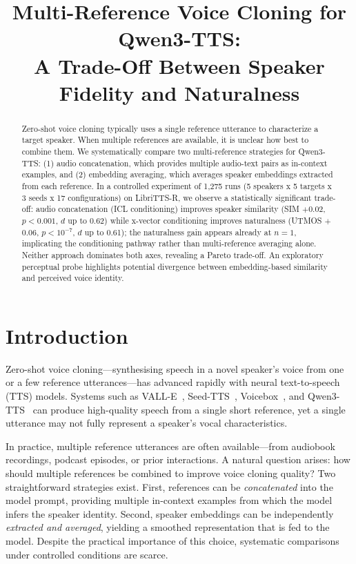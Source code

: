 \documentclass{Interspeech}
\title{Multi-Reference Voice Cloning for Qwen3-TTS:\\
A Trade-Off Between Speaker Fidelity and Naturalness}
\begin{document}
\maketitle

\begin{abstract}
Zero-shot voice cloning typically uses a single reference utterance to characterize a target speaker. When multiple references are available, it is unclear how best to combine them. We systematically compare two multi-reference strategies for Qwen3-TTS: (1) audio concatenation, which provides multiple audio-text pairs as in-context examples, and (2) embedding averaging, which averages speaker embeddings extracted from each reference. In a controlled experiment of 1,275 runs (5 speakers x 5 targets x 3 seeds x 17 configurations) on LibriTTS-R, we observe a statistically significant trade-off: audio concatenation (ICL conditioning) improves speaker similarity (SIM $+$0.02, $p{<}0.001$, $d$ up to 0.62) while x-vector conditioning improves naturalness (UTMOS $+$0.06, $p{<}10^{-7}$, $d$ up to 0.61); the naturalness gain appears already at $n{=}1$, implicating the conditioning pathway rather than multi-reference averaging alone. Neither approach dominates both axes, revealing a Pareto trade-off. An exploratory perceptual probe highlights potential divergence between embedding-based similarity and perceived voice identity.
\end{abstract}

\section{Introduction}
\label{sec:intro}

Zero-shot voice cloning---synthesising speech in a novel speaker's voice from one or a few reference utterances---has advanced rapidly with neural text-to-speech (TTS) models.
Systems such as VALL-E~\cite{valle}, Seed-TTS~\cite{seedtts}, Voicebox~\cite{voicebox}, and Qwen3-TTS~\cite{qwen3tts} can produce high-quality speech from a single short reference, yet a single utterance may not fully represent a speaker's vocal characteristics.

In practice, multiple reference utterances are often available---from audiobook recordings, podcast episodes, or prior interactions.
A natural question arises: how should multiple references be combined to improve voice cloning quality?
Two straightforward strategies exist.
First, references can be \emph{concatenated} into the model prompt, providing multiple in-context examples from which the model infers the speaker identity.
Second, speaker embeddings can be independently \emph{extracted and averaged}, yielding a smoothed representation that is fed to the model.
Despite the practical importance of this choice, systematic comparisons under controlled conditions are scarce.
\end{document}
